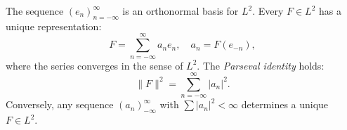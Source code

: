 The sequence $(e_n)_{n=-\infty}^{\infty}$ is an orthonormal basis for $L^2$. Every $F \in L^2$ has a unique representation:
\[
F = \sum_{n=-\infty}^{\infty} a_n e_n, \quad a_n = F(e_{-n}),
\]
where the series converges in the sense of $L^2$. The \textit{Parseval identity} holds:
\[
\|F\|^2 = \sum_{n=-\infty}^{\infty} |a_n|^2.
\]
Conversely, any sequence $(a_n)_{-\infty}^{\infty}$ with $\sum |a_n|^2 < \infty$ determines a unique $F \in L^2$.
